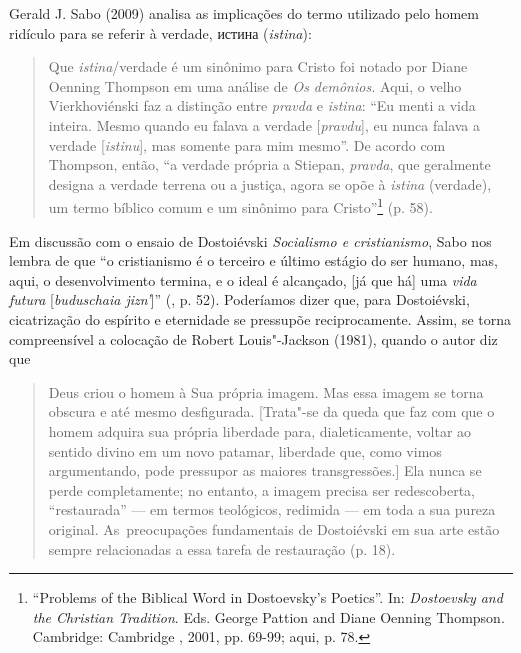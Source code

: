 Gerald J. Sabo (2009) analisa as implicações do termo utilizado pelo
homem ridículo para se referir à verdade,
истина
(\emph{istina}):

\begin{quote}
Que \emph{istina}/verdade é um sinônimo para Cristo foi notado por Diane
Oenning Thompson em uma análise de \emph{Os demônios.} Aqui, o velho
Vierkhoviénski faz a distinção entre \emph{pravda} e \emph{istina}: ``Eu
menti a vida inteira. Mesmo quando eu falava a verdade
[\emph{pravdu}], eu nunca falava a verdade [\emph{istinu}], mas
somente para mim mesmo''. De acordo com Thompson, então, ``a verdade
própria a Stiepan, \emph{pravda}, que geralmente designa a verdade
terrena ou a justiça, agora se opõe à \emph{istina} (verdade), um termo
bíblico comum e um sinônimo para Cristo''\footnote{``Problems of the
  Biblical Word in Dostoevsky's Poetics''. In: \emph{Dostoevsky and the
  Christian Tradition}. Eds. George Pattion and Diane Oenning Thompson.
  Cambridge: Cambridge , 2001, pp. 69-99; aqui, p. 78.} (p. 58).
\end{quote}

Em discussão com o ensaio de Dostoiévski \emph{Socialismo e
cristianismo}, Sabo nos lembra de que ``o cristianismo é o terceiro e
último estágio do ser humano, mas, aqui, o desenvolvimento termina, e o
ideal é alcançado, {[}já que há{]} uma \emph{vida futura}
{[}\emph{buduschaia jizn'}{]}'' (, p. 52). Poderíamos dizer que,
para Dostoiévski, cicatrização do espírito e eternidade se pressupõe
reciprocamente. Assim, se torna compreensível a colocação de Robert
Louis"-Jackson (1981), quando o autor diz que

\begin{quote}
Deus criou o homem à Sua própria imagem. Mas essa imagem se torna
obscura e até mesmo desfigurada. {[}Trata"-se da queda que faz com que o
homem adquira sua própria liberdade para, dialeticamente, voltar ao
sentido divino em um novo patamar, liberdade que, como vimos
argumentando, pode pressupor as maiores transgressões.{]} Ela nunca se
perde completamente; no entanto, a imagem precisa ser redescoberta,
``restaurada'' --- em termos teológicos, redimida --- em toda a sua pureza
original. As~preocupações fundamentais de Dostoiévski em sua arte estão
sempre relacionadas a essa tarefa de restauração (p. 18).
\end{quote}

